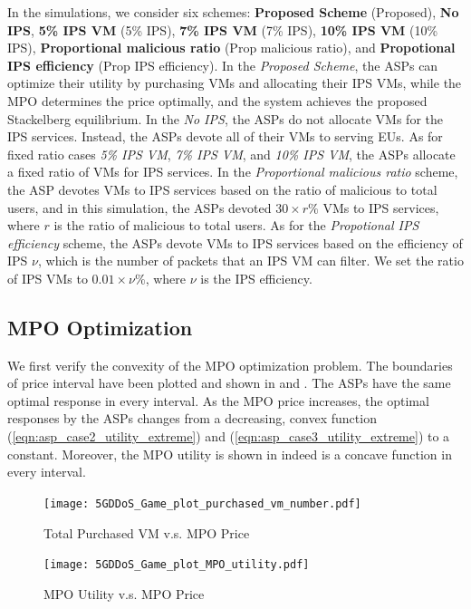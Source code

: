 \documentclass[10pt,journal, compsoc]{IEEEtran}
\begin{document}
In the simulations, we consider six schemes: \textbf{Proposed Scheme} (Proposed), \textbf{No IPS}, \textbf{5\% IPS VM} (5\% IPS), \textbf{7\% IPS VM} (7\% IPS), \textbf{10\% IPS VM} (10\% IPS), \textbf{Proportional malicious ratio} (Prop malicious ratio), and \textbf{Propotional IPS efficiency} (Prop IPS efficiency). In the \textit{Proposed Scheme}, the ASPs can optimize their utility by purchasing VMs and allocating their IPS VMs, while the MPO determines the price optimally, and the system achieves the proposed Stackelberg equilibrium. In the \textit{No IPS}, the ASPs do not allocate VMs for the IPS services. Instead, the ASPs devote all of their VMs to serving EUs. As for fixed ratio cases \textit{5\% IPS VM}, \textit{7\% IPS VM}, and \textit{10\% IPS VM}, the ASPs allocate a fixed ratio of VMs for IPS services. In the \textit{Proportional malicious ratio} scheme, the ASP devotes VMs to IPS services based on the ratio of malicious to total users, and in this simulation, the ASPs devoted $30 \times r \%$ VMs to IPS services, where $r$ is the ratio of malicious to total users. As for the \textit{Propotional IPS efficiency} scheme, the ASPs devote VMs to IPS services based on the efficiency of IPS $\nu$, which is the number of packets that an IPS VM can filter. We set the ratio of IPS VMs to $0.01 \times \nu \%$, where $\nu$ is the IPS efficiency.

\subsection{MPO Optimization}\label{MPO_opti}
We first verify the convexity of the MPO optimization problem. The boundaries of price interval have been plotted and shown in  and . The ASPs have the same optimal response in every interval. As the MPO price increases, the optimal responses by the ASPs changes from a decreasing, convex function (\ref{eqn:asp_case2_utility_extreme}) and (\ref{eqn:asp_case3_utility_extreme}) to a constant. Moreover, the MPO utility is shown in  indeed is a concave function in every interval. 
\begin{figure}
    \begin{minipage}{0.45\linewidth}
        \centering
        \texttt{[image: 5GDDoS\_Game\_plot\_purchased\_vm\_number.pdf]}
        \caption{Total Purchased VM v.s. MPO Price}
        \label{fig:VMnum}
    \end{minipage}
    \begin{minipage}{0.45\linewidth}
        \centering
        \texttt{[image: 5GDDoS\_Game\_plot\_MPO\_utility.pdf]}
        \caption{MPO Utility v.s. MPO Price}
        \label{fig:MPOutil}
    \end{minipage}
\end{figure}
\end{document}

